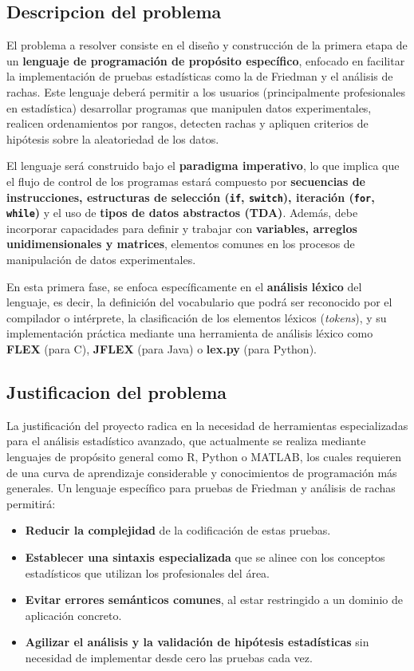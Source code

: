 \documentclass{article}
\begin{document}
\subsection{Descripcion del problema}

El problema a resolver consiste en el diseño y construcción de la primera etapa de un \textbf{lenguaje de programación de propósito específico}, enfocado en facilitar la implementación de pruebas estadísticas como la de Friedman y el análisis de rachas. Este lenguaje deberá permitir a los usuarios (principalmente profesionales en estadística) desarrollar programas que manipulen datos experimentales, realicen ordenamientos por rangos, detecten rachas y apliquen criterios de hipótesis sobre la aleatoriedad de los datos.

El lenguaje será construido bajo el \textbf{paradigma imperativo}, lo que implica que el flujo de control de los programas estará compuesto por \textbf{secuencias de instrucciones, estructuras de selección (\texttt{if}, \texttt{switch}), iteración (\texttt{for}, \texttt{while})} y el uso de \textbf{tipos de datos abstractos (TDA)}. Además, debe incorporar capacidades para definir y trabajar con \textbf{variables, arreglos unidimensionales y matrices}, elementos comunes en los procesos de manipulación de datos experimentales.

En esta primera fase, se enfoca específicamente en el \textbf{análisis léxico} del lenguaje, es decir, la definición del vocabulario que podrá ser reconocido por el compilador o intérprete, la clasificación de los elementos léxicos (\emph{tokens}), y su implementación práctica mediante una herramienta de análisis léxico como \textbf{FLEX} (para C), \textbf{JFLEX} (para Java) o \textbf{lex.py} (para Python).

\subsection{Justificacion del problema}

La justificación del proyecto radica en la necesidad de herramientas especializadas para el análisis estadístico avanzado, que actualmente se realiza mediante lenguajes de propósito general como R, Python o MATLAB, los cuales requieren de una curva de aprendizaje considerable y conocimientos de programación más generales. Un lenguaje específico para pruebas de Friedman y análisis de rachas permitirá:

\begin{itemize}
  \item \textbf{Reducir la complejidad} de la codificación de estas pruebas.
  \item \textbf{Establecer una sintaxis especializada} que se alinee con los conceptos estadísticos que utilizan los profesionales del área.
  \item \textbf{Evitar errores semánticos comunes}, al estar restringido a un dominio de aplicación concreto.
  \item \textbf{Agilizar el análisis y la validación de hipótesis estadísticas} sin necesidad de implementar desde cero las pruebas cada vez.
\end{itemize}
\end{document}
